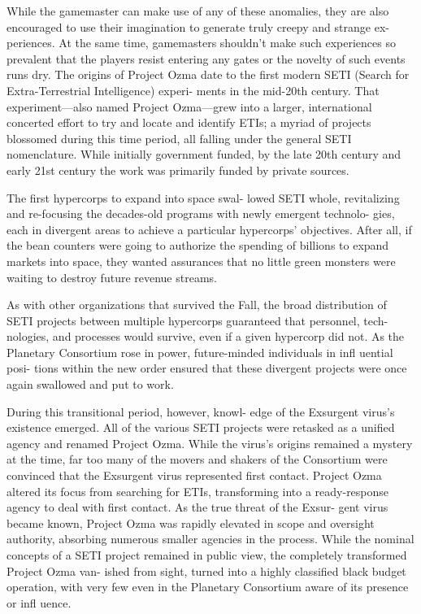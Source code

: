 While the gamemaster can make use of any of 
these anomalies, they are also encouraged to use their 
imagination to generate truly creepy and strange ex-
periences. At the same time, gamemasters shouldn't 
make such experiences so prevalent that the players 
resist entering any gates or the novelty of such events 
runs dry.
The origins of Project Ozma date to the first modern 
SETI (Search for Extra-Terrestrial Intelligence) experi-
ments in the mid-20th century. That experiment—also 
named Project Ozma—grew into a larger, international 
concerted effort to try and locate and identify ETIs; a 
myriad of projects blossomed during this time period, 
all falling under the general SETI nomenclature. While 
initially government funded, by the late 20th century 
and early 21st century the work was primarily funded 
by private sources. 

The first hypercorps to expand into space swal-
lowed SETI whole, revitalizing and re-focusing the 
decades-old programs with newly emergent technolo-
gies, each in divergent areas to achieve a particular 
hypercorps' objectives. After all, if the bean counters 
were going to authorize the spending of billions to 
expand markets into space, they wanted assurances 
that no little green monsters were waiting to destroy 
future revenue streams. 

As with other organizations that survived the Fall, 
the broad distribution of SETI projects between 
multiple hypercorps guaranteed that personnel, tech-
nologies, and processes would survive, even if a given 
hypercorp did not. As the Planetary Consortium rose 
in power, future-minded individuals in infl uential posi-
tions within the new order ensured that these divergent 
projects were once again swallowed and put to work. 

During this transitional period, however, knowl-
edge of the Exsurgent virus's existence emerged. All 
of the various SETI projects were retasked as a unified 
agency and renamed Project Ozma. While the virus's 
origins remained a mystery at the time, far too many 
of the movers and shakers of the Consortium were 
convinced that the Exsurgent virus represented first 
contact. Project Ozma altered its focus from searching 
for ETIs, transforming into a ready-response agency to 
deal with first contact. As the true threat of the Exsur-
gent virus became known, Project Ozma was rapidly 
elevated in scope and oversight authority, absorbing 
numerous smaller agencies in the process. While the 
nominal concepts of a SETI project remained in public 
view, the completely transformed Project Ozma van-
ished from sight, turned into a highly classified black 
budget operation, with very few even in the Planetary 
Consortium aware of its presence or infl uence. 

